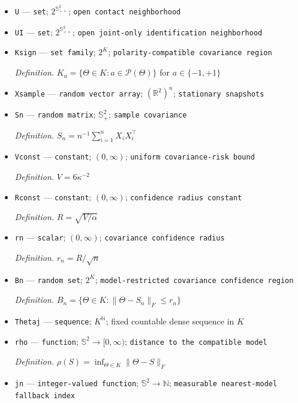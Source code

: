 \documentclass{article}
\begin{document}
\begin{itemize}
  \item \texttt{U} --- \texttt{set}; \(2^{\mathbb S_{++}^{2}}\); \texttt{open contact neighborhood}
  \item \texttt{UI} --- \texttt{set}; \(2^{\mathbb S_{++}^{2}}\); \texttt{open joint-\allowbreak{}only identification neighborhood}
  \item \texttt{Ksign} --- \texttt{set family}; \(2^{K}\); \texttt{polarity-\allowbreak{}compatible covariance region}
  \par\smallskip\noindent\emph{Definition.} \(K_a=\{\Theta\in K:a\in\mathcal P(\Theta)\}\) for \(a\in\{-1,+1\}\)
  \item \texttt{Xsample} --- \texttt{random vector array}; \((\mathbb R^2)^n\); \texttt{stationary snapshots}
  \item \texttt{Sn} --- \texttt{random matrix}; \(\mathbb S_{+}^{2}\); \texttt{sample covariance}
  \par\smallskip\noindent\emph{Definition.} \(S_n=n^{-1}\sum_{i=1}^n X_iX_i^{\top}\)
  \item \texttt{Vconst} --- \texttt{constant}; \((0,\infty)\); \texttt{uniform covariance-\allowbreak{}risk bound}
  \par\smallskip\noindent\emph{Definition.} \(V=6\kappa^{-2}\)
  \item \texttt{Rconst} --- \texttt{constant}; \((0,\infty)\); \texttt{confidence radius constant}
  \par\smallskip\noindent\emph{Definition.} \(R=\sqrt{V/\alpha}\)
  \item \texttt{rn} --- \texttt{scalar}; \((0,\infty)\); \texttt{covariance confidence radius}
  \par\smallskip\noindent\emph{Definition.} \(r_n=R/\sqrt n\)
  \item \texttt{Bn} --- \texttt{random set}; \(2^K\); \texttt{model-\allowbreak{}restricted covariance confidence region}
  \par\smallskip\noindent\emph{Definition.} \(B_n=\{\Theta\in K:\lVert\Theta-S_n\rVert_F\le r_n\}\)
  \item \texttt{Thetaj} --- \texttt{sequence}; \(K^{\mathbb N}\); fixed countable dense sequence in \(K\)
  \item \texttt{rho} --- \texttt{function}; \(\mathbb S^2\to[0,\infty)\); \texttt{distance to the compatible model}
  \par\smallskip\noindent\emph{Definition.} \(\rho(S)=\inf_{\Theta\in K}\lVert\Theta-S\rVert_F\)
  \item \texttt{jn} --- \texttt{integer-\allowbreak{}valued function}; \(\mathbb S^2\to\mathbb N\); \texttt{measurable nearest-\allowbreak{}model fallback index}

\end{itemize}
\end{document}
